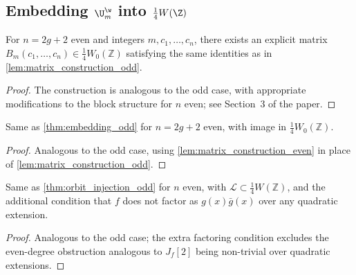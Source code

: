 \subsection{Embedding $\U_m^\w$ into $\frac14W(\Z)$}

\begin{lemma}
  \label{lem:matrix_construction_even}
  For \(n=2g+2\) even and integers \(m,c_1,\ldots,c_n\), there exists
  an explicit matrix \(B_m(c_1,\ldots,c_n)\in\tfrac{1}{4}W_0(\mathbb{Z})\)
  satisfying the same identities as in \cref{lem:matrix_construction_odd}.
\end{lemma}
\begin{proof}
  The construction is analogous to the odd case, with appropriate
  modifications to the block structure for \(n\) even; see Section~3
  of the paper.
\end{proof}

\begin{theorem}
  \label{thm:embedding_even}
  Same as \cref{thm:embedding_odd} for \(n=2g+2\) even, with image in
  \(\tfrac14 W_0(\mathbb{Z})\).
\end{theorem}
\begin{proof}
  Analogous to the odd case, using \cref{lem:matrix_construction_even}
  in place of \cref{lem:matrix_construction_odd}.
\end{proof}

\begin{theorem}
  \label{thm:orbit_injection_even}
  Same as \cref{thm:orbit_injection_odd} for \(n\) even, with
  \(\mathcal{L}\subset\tfrac14 W(\mathbb{Z})\), and the additional
  condition that \(f\) does not factor as \(g(x)\bar{g}(x)\) over any
  quadratic extension.
\end{theorem}
\begin{proof}
  Analogous to the odd case; the extra factoring condition excludes
  the even-degree obstruction analogous to \(J_f[2]\) being
  non-trivial over quadratic extensions.
\end{proof}


